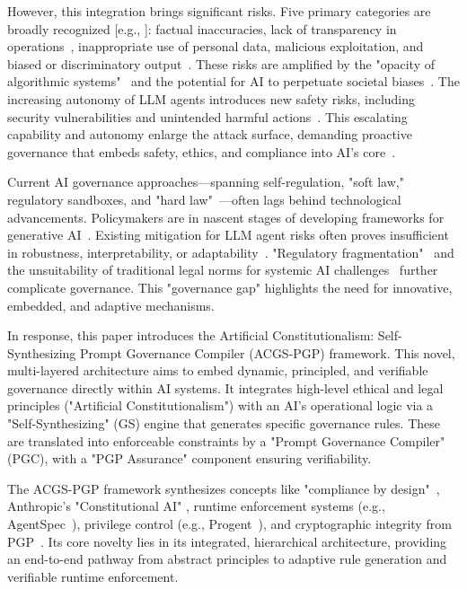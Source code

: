 \documentclass[sigconf,review,anonymous=false]{acmart} %
\begin{document}
However, this integration brings significant risks. Five primary categories are broadly recognized [e.g., \cite{FPFGenAIGov24}]: factual inaccuracies, lack of transparency in operations~\cite{EuroParlAlgoTransparency19}, inappropriate use of personal data, malicious exploitation, and biased or discriminatory output~\cite{WorldBankAIGov24}. These risks are amplified by the "opacity of algorithmic systems"~\cite{EuroParlAlgoTransparency19} and the potential for AI to perpetuate societal biases~\cite{WorldBankAIGov24}. The increasing autonomy of LLM agents introduces new safety risks, including security vulnerabilities and unintended harmful actions~\cite{WangAgentSpec25}. This escalating capability and autonomy enlarge the attack surface, demanding proactive governance that embeds safety, ethics, and compliance into AI's core~\cite{LiMAST25}.

Current AI governance approaches—spanning self-regulation, "soft law," regulatory sandboxes, and "hard law"~\cite{WorldBankAIGov24}—often lags behind technological advancements. Policymakers are in nascent stages of developing frameworks for generative AI~\cite{FPFGenAIGov24}. Existing mitigation for LLM agent risks often proves insufficient in robustness, interpretability, or adaptability~\cite{WangAgentSpec25}. "Regulatory fragmentation"~\cite{FPFGenAIGov24} and the unsuitability of traditional legal norms for systemic AI challenges~\cite{HuqConstitutionalRightsML} further complicate governance. This "governance gap" highlights the need for innovative, embedded, and adaptive mechanisms.

In response, this paper introduces the Artificial Constitutionalism: Self-Synthesizing Prompt Governance Compiler (ACGS-PGP) framework. This novel, multi-layered architecture aims to embed dynamic, principled, and verifiable governance directly within AI systems. It integrates high-level ethical and legal principles ("Artificial Constitutionalism") with an AI's operational logic via a "Self-Synthesizing" (GS) engine that generates specific governance rules. These are translated into enforceable constraints by a "Prompt Governance Compiler" (PGC), with a "PGP Assurance" component ensuring verifiability.

The ACGS-PGP framework synthesizes concepts like "compliance by design"~\cite{MartinezComplianceByDesign19}, Anthropic's "Constitutional AI"%
, runtime enforcement systems (e.g., AgentSpec~\cite{WangAgentSpec25}), privilege control (e.g., Progent~\cite{LianProgent25}), and cryptographic integrity from PGP~\cite{WikipediaPGP}. Its core novelty lies in its integrated, hierarchical architecture, providing an end-to-end pathway from abstract principles to adaptive rule generation and verifiable runtime enforcement.
\end{document}
